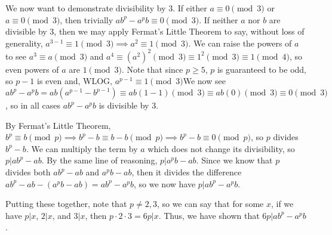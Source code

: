 \documentclass[12pt]{amsart}
\begin{document}
\smallskip

We now want to demonstrate divisibility by 3. If either $a\equiv 0\pmod{3}$ or $a\equiv 0\pmod{3}$, then trivially $ab^p-a^pb\equiv 0\pmod{3}$. If neither $a$ nor $b$ are divisible by 3, then we may apply Fermat's Little Theorem to say, without loss of generality, $a^{3-1}\equiv 1\pmod{3} \implies a^2\equiv 1\pmod{3}$. We can raise the powers of $a$ to see $a^3 \equiv a\pmod{3}$ and $a^4\equiv (a^2)^2 \pmod{3} \equiv 1^2 \pmod{3} \equiv 1\pmod{4}$, so even powers of $a$ are $1\pmod{3}$. Note that since $p\geq5$, $p$ is guaranteed to be odd, so $p-1$ is even and, WLOG, $a^{p-1}\equiv 1\pmod{3}$We now see $ab^p - a^pb = ab(a^{p-1} - b^{p-1})\equiv ab(1 - 1)\pmod{3} \equiv ab(0)\pmod{3}\equiv 0\pmod{3}$, so in all cases $ab^p - a^pb$ is divisible by 3.

\smallskip

By Fermat's Little Theorem, $b^p\equiv b\pmod{p} \implies b^p-b\equiv b-b\pmod{p}\implies b^p-b\equiv 0\pmod{p}$, so $p$ divides $b^p-b$. We can multiply the term by $a$ which does not change its divisibility, so $p|ab^p - ab$. By the same line of reasoning, $p|a^pb-ab$. Since we know that $p$ divides both $ab^p-ab$ and $a^pb-ab$, then it divides the difference $ab^p-ab - (a^pb-ab) = ab^p-a^pb$, so we now have $p|ab^p - a^pb$.

\smallskip

Putting these together, note that $p\neq 2,3$, so we can say that for some $x$, if we have $p|x$, $2|x$, and $3|x$, then $p\cdot 2\cdot 3 = 6p|x$. Thus, we have shown that $6p|ab^p-a^pb$.

\newpage
\end{document}
